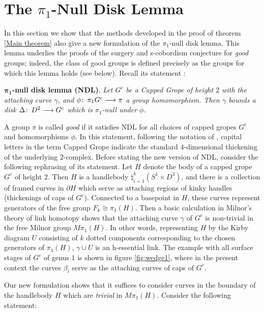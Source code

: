 \documentclass[12pt]{amsart}
\theoremstyle{definition}
\theoremstyle{remark}
\numberwithin{equation}{section}
\theoremstyle{plain}
\theoremstyle{definition}
\newcommand{\co}{\colon\thinspace}
\numberwithin{figure}{section}
\begin{document}
\section{The ${\pi}_1$-Null Disk Lemma} \label{NDL section}

In this section we show that the methods developed in the proof of theorem \ref{Main theorem} also give a new formulation of the  ${\pi}_1$-null disk lemma. This lemma underlies the proofs of the surgery and s-cobordism conjecture for {\em good} groups;  indeed, the class of good groups is defined precisely as the groups for which this lemma holds (see below). Recall its statement \cite{FT}:

\smallskip

{\bf $\mathbf{{\pi}_1}$-null disk lemma (NDL)}. {\sl Let $G^c$ be a Capped Grope of height $2$ with the attaching curve $\gamma$, and ${\phi}\co {\pi}_1 G^c\longrightarrow {\pi}$ a group homomorphism. Then $\gamma$ bounds a disk ${\Delta}\co D^2\longrightarrow G^c$ which is ${\pi}_1$-null under $\phi$.}

\smallskip

A group ${\pi}$ is called {\em good} if it satisfies NDL for all choices of capped gropes $G^c$ and homomorphisms ${\phi}$.
In this statement, following the notation of \cite{FT}, capital letters in the term Capped Grope indicate the standard $4$-dimensional thickening of the underlying $2$-complex. 
Before stating the new version of NDL, consider the following rephrasing of its statement. Let $H$ denote the body of a capped grope $G^c$ of height $2$. Then $H$ is a handlebody $\natural_{i=1}^k (S^1\times D^3)$, and there is a collection of framed curves in $\partial H$ which serve as attaching regions of kinky handles (thickenings of caps of $G^c$). Connected to a basepoint in $H$, these curves represent generators of the free group $F_k\cong {\pi}_1 (H)$. Then a basic calculation in Milnor's theory of link homotopy shows that the attaching curve $\gamma$ of $G^c$ is non-trivial in the free Milnor group $M{\pi}_1(H)$. In other words, representing $H$ by  the Kirby diagram $U$ consisting of $k$ dotted components corresponding to the chosen generators of ${\pi}_1(H)$,   ${\gamma}\cup U$ is an h-essential link.  The example with all surface stages of $G^c$ of genus $1$ is shown in figure \ref{fig:wedge1}, where in the present context the curves ${\beta}_i$ serve as the attaching curves of caps of $G^c$.

Our new formulation shows that it suffices to consider curves  in the boundary  of the handlebody $H$ which are {\em trivial} in $M{\pi}_1(H)$. Consider the following statement:
\end{document}
